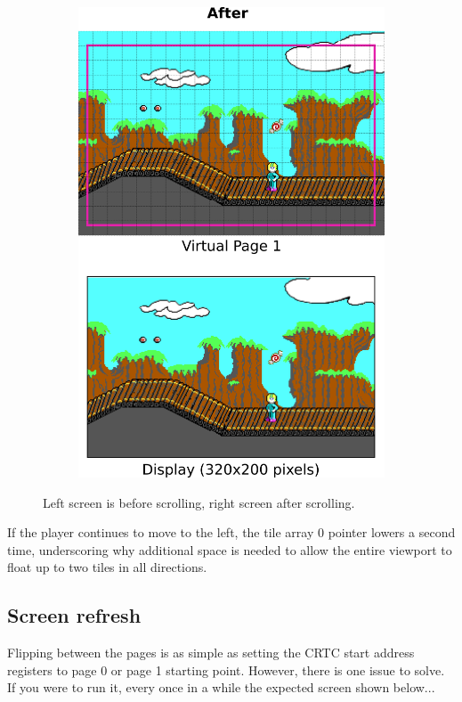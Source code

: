 \documentclass[book.tex]{subfiles}
\begin{document}
\begin{figure}[H]
\begin{subfigure}{.5\textwidth}
  \includegraphics[width=.95\linewidth]{screenshots_300dpi/game/Scroll_KC4_6_2.png}
\end{subfigure}
\caption{Left screen is before scrolling, right screen after scrolling.}
\label{fig:kc4_6_scroll}
\end{figure}

\par
If the player continues to move to the left, the tile array 0 pointer lowers a second time, underscoring why additional space is needed to allow the entire viewport to float up to two tiles in all directions.\\

\subsection{Screen refresh} 
Flipping between the pages is as simple as setting the CRTC start address registers to page 0 or page 1 starting point. However, there is one issue to solve. If you were to run it, every once in a while the expected screen shown below...
\end{document}
